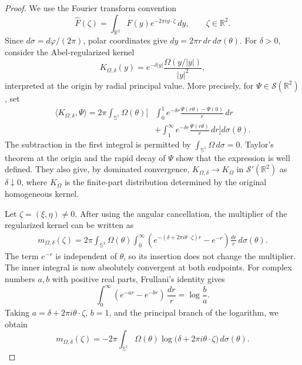 \documentclass[11pt]{amsart}
\theoremstyle{remark}
\numberwithin{equation}{section}
\newcommand{\R}{\mathbb R}
\newcommand{\Sph}{\mathbb S^1}
\begin{document}
	\begin{proof}
		We use the Fourier transform convention
		\[
		\widehat F(\zeta)
		=
		\int_{\R^2}F(y)e^{-2\pi i y\cdot\zeta}\,dy,
		\qquad \zeta\in\R^2.
		\]
		Since \(d\sigma=d\varphi/(2\pi)\), polar coordinates give
		\(dy=2\pi r\,dr\,d\sigma(\theta)\). For \(\delta>0\), consider the
		Abel-regularized kernel
		\[
		K_{\Omega,\delta}(y)
		=
		e^{-\delta|y|}\frac{\Omega(y/|y|)}{|y|^2},
		\]
		interpreted at the origin by radial principal value. More precisely, for
		\(\Psi\in\mathcal S(\R^2)\), set
		\[
		\begin{aligned}
			\langle K_{\Omega,\delta},\Psi\rangle
			=2\pi\int_{\Sph}\Omega(\theta)\bigg[
			&\int_0^1 e^{-\delta r}
			\frac{\Psi(r\theta)-\Psi(0)}r\,dr\\
			&+\int_1^\infty e^{-\delta r}
			\frac{\Psi(r\theta)}r\,dr
			\bigg]d\sigma(\theta).
		\end{aligned}
		\]
		The subtraction in the first integral is permitted by
		\(\int_{\Sph}\Omega\,d\sigma=0\). Taylor's theorem at the origin and
		the rapid decay of \(\Psi\) show that the expression is well defined.
		They also give, by dominated convergence,
		\(K_{\Omega,\delta}\to K_\Omega\) in \(\mathcal S'(\R^2)\) as
		\(\delta\downarrow0\), where \(K_\Omega\) is the finite-part distribution
		determined by the original homogeneous kernel.
		
		Let \(\zeta=(\xi,\eta)\ne0\). After using the angular cancellation, the
		multiplier of the regularized kernel can be written as
		\[
		\begin{aligned}
			m_{\Omega,\delta}(\zeta)
			=2\pi\int_{\Sph}\Omega(\theta)
			\int_0^\infty
			\left(
			e^{-(\delta+2\pi i\theta\cdot\zeta)r}-e^{-r}
			\right)\frac{dr}{r}\,d\sigma(\theta).
		\end{aligned}
		\]
		The term \(e^{-r}\) is independent of \(\theta\), so its insertion does
		not change the multiplier. The inner integral is now absolutely convergent
		at both endpoints. For complex numbers \(a,b\) with positive real parts,
		Frullani's identity gives
		\[
		\int_0^\infty(e^{-ar}-e^{-br})\,\frac{dr}{r}
		=
		\log\frac ba.
		\]
		Taking \(a=\delta+2\pi i\theta\cdot\zeta\), \(b=1\), and the principal
		branch of the logarithm, we obtain
		\[
		m_{\Omega,\delta}(\zeta)
		=
		-2\pi\int_{\Sph}\Omega(\theta)
		\log\bigl(\delta+2\pi i\theta\cdot\zeta\bigr)\,d\sigma(\theta).
		\]
		

\end{proof}
\end{document}

